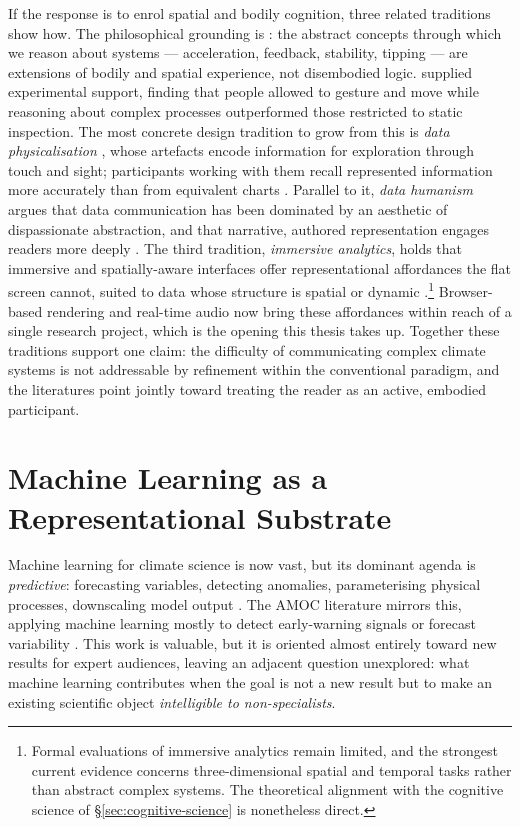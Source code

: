 If the response is to enrol spatial and bodily cognition, three related traditions show how. The philosophical grounding is \citet{lakoff1999}: the abstract concepts through which we reason about systems --- acceleration, feedback, stability, tipping --- are extensions of bodily and spatial experience, not disembodied logic. \citet{kirsh2013} supplied experimental support, finding that people allowed to gesture and move while reasoning about complex processes outperformed those restricted to static inspection. The most concrete design tradition to grow from this is \emph{data physicalisation} \citep{jansen2015}, whose artefacts encode information for exploration through touch and sight; participants working with them recall represented information more accurately than from equivalent charts \citep{moere2010}. Parallel to it, \emph{data humanism} argues that data communication has been dominated by an aesthetic of dispassionate abstraction, and that narrative, authored representation engages readers more deeply \citep{lupi2017, segel2010}. The third tradition, \emph{immersive analytics}, holds that immersive and spatially-aware interfaces offer representational affordances the flat screen cannot, suited to data whose structure is spatial or dynamic \citep{marriott2018}.\footnote{Formal evaluations of immersive analytics remain limited, and the strongest current evidence concerns three-dimensional spatial and temporal tasks rather than abstract complex systems. The theoretical alignment with the cognitive science of \S\ref{sec:cognitive-science} is nonetheless direct.} Browser-based rendering and real-time audio now bring these affordances within reach of a single research project, which is the opening this thesis takes up. Together these traditions support one claim: the difficulty of communicating complex climate systems is not addressable by refinement within the conventional paradigm, and the literatures point jointly toward treating the reader as an active, embodied participant.

\section{Machine Learning as a Representational Substrate}
\label{sec:ml-climate}

Machine learning for climate science is now vast, but its dominant agenda is \emph{predictive}: forecasting variables, detecting anomalies, parameterising physical processes, downscaling model output \citep{reichstein2019, sonnewald2021}. The AMOC literature mirrors this, applying machine learning mostly to detect early-warning signals or forecast variability \citep{boers2021, ditlevsen2023}. This work is valuable, but it is oriented almost entirely toward new results for expert audiences, leaving an adjacent question unexplored: what machine learning contributes when the goal is not a new result but to make an existing scientific object \emph{intelligible to non-specialists}.

